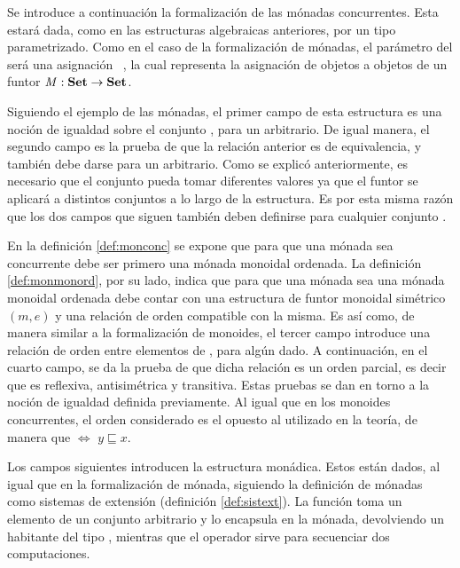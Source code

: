 Se introduce a continuación la formalización de las mónadas concurrentes. Esta estará dada, como en las estructuras algebraicas anteriores, por un tipo  parametrizado. Como en el caso de la formalización de mónadas, el parámetro del   será una asignación \hbox{ \AgdaSymbol{:}  \AgdaSymbol{$\rightarrow$} }, la cual representa la asignación de objetos a objetos de un funtor $\mathit{M} : \text{\bf Set} \rightarrow \text{\bf Set}$.


Siguiendo el ejemplo de las mónadas, el primer campo de esta estructura es una noción de igualdad sobre el conjunto , para un  arbitrario. De igual manera, el segundo campo es la prueba de que la relación anterior es de equivalencia, y también debe darse para un  arbitrario. Como se explicó anteriormente, es necesario que el conjunto  pueda tomar diferentes valores ya que el funtor  se aplicará a distintos conjuntos a lo largo de la estructura. Es por esta misma razón que los dos campos que siguen también deben definirse para cualquier conjunto . 

En la definición \ref{def:monconc} se expone que para que una mónada sea concurrente debe ser primero una mónada monoidal ordenada. La definición \ref{def:monmonord}, por su lado, indica que para que una mónada sea una mónada monoidal ordenada debe contar con una estructura de funtor monoidal simétrico $(m,e)$ y una relación de orden compatible con la misma. Es así como, de manera similar a la formalización de monoides, el tercer campo introduce una relación de orden entre elementos de , para algún  dado. A continuación, en el cuarto campo, se da la prueba de que dicha relación es un orden parcial, es decir que es reflexiva, antisimétrica y transitiva. Estas pruebas se dan en torno a la noción de igualdad definida previamente. Al igual que en los monoides concurrentes, el orden considerado es el opuesto al utilizado en la teoría, de manera que    $\Leftrightarrow$ $y \sqsubseteq x$. 

Los campos siguientes introducen la estructura monádica. Estos están dados, al igual que en la formalización de mónada, siguiendo la definición de mónadas como sistemas de extensión (definición \ref{def:sistext}). La función  toma un elemento de un conjunto  arbitrario y lo encapsula en la mónada, devolviendo un habitante del tipo , mientras que el operador \AgdaField{$\gg=$} sirve para secuenciar dos computaciones. 

